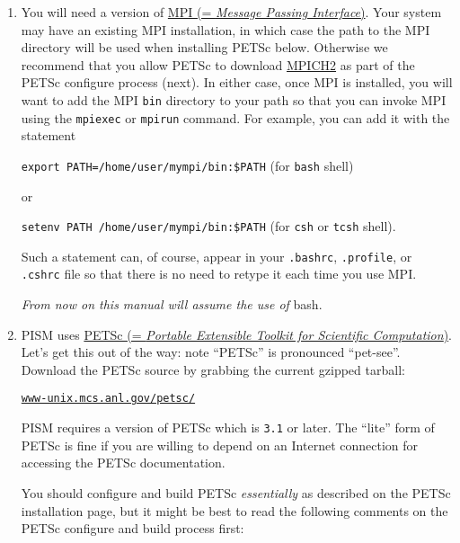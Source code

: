 \documentclass[11pt,final]{amsart}
\newcommand{\PETSCREL}{3.1}
\renewcommand{\t}[1]{\texttt{#1}}
\begin{document}
\begin{enumerate}
\item You will need a version of \href{http://www-unix.mcs.anl.gov/mpi/}{MPI (= \emph{Message Passing Interface})}. Your system may have an existing MPI installation, in which case the path to the MPI
  directory will be used when installing PETSc below. Otherwise we recommend that you allow PETSc to download
  \href{http://www-unix.mcs.anl.gov/mpi/mpich2/}{MPICH2} as part of the PETSc configure process (next). In either case, once MPI
  is installed, you will want to add the MPI \texttt{bin} directory to your path so that you can invoke MPI using the \texttt{mpiexec}
  or \texttt{mpirun} command. For example, you can add it with the statement

\texttt{export PATH=/home/user/mympi/bin:\$PATH}  \qquad (for \texttt{bash} shell)

\noindent or

\texttt{setenv PATH /home/user/mympi/bin:\$PATH}  \qquad (for \texttt{csh} or \texttt{tcsh} shell).

\noindent Such a statement can, of course, appear in your \texttt{.bashrc}, \texttt{.profile}, or \texttt{.cshrc} file so that there is
no need to retype it each time you use MPI.

\medskip
\begin{center}
  \emph{From now on this manual will assume the use of} bash.
\end{center}
\medskip

\item PISM uses \href{http://www-unix.mcs.anl.gov/petsc/}{PETSc (= \emph{Portable Extensible Toolkit for
 Scientific Computation})}.  Let's get this out of the way: note ``PETSc'' is pronounced ``pet-see''.  Download the PETSc source by grabbing the current gzipped tarball:
\begin{center}
    \href{http://www-unix.mcs.anl.gov/petsc/}{\t{www-unix.mcs.anl.gov/petsc/}}
\end{center}
PISM requires a version of PETSc which is \texttt{\PETSCREL} or later.  The ``lite'' form of PETSc is fine if you are willing to depend on an Internet connection for accessing the PETSc documentation.

You should configure and build PETSc \emph{essentially} as described on the PETSc installation page, but it might be best to read the following comments on the PETSc configure and build process first:


\end{enumerate}
\end{document}
